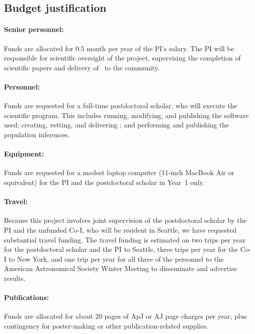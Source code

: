 \documentclass[12pt]{article}
\begin{document}
\subsection*{Budget justification}

\paragraph{Senior personnel:}
Funds are allocated for 0.5 month per year of the PI's salary.
The PI will be responsible for scientific oversight of the project,
supervising the completion of scientific papers and delivery of
\catalogname\ to the community.

\paragraph{Personnel:}
Funds are requested for a full-time postdoctoral scholar, who will
execute the scientific program.
This includes running, modifying, and publishing the software used;
creating, vetting, and delivering \catalogname;
and performing and publishing the population inferences.

\paragraph{Equipment:}
Funds are requested for a modest laptop computer (11-inch MacBook Air
or equivalent) for the PI and the postdoctoral scholar in Year~1 only.

\paragraph{Travel:}
Because this project involves joint supervision of the postdoctoral
scholar by the PI and the unfunded Co-I, who will be resident in
Seattle, we have requested substantial travel funding.
The travel funding is estimated on two trips per year for the
postdoctoral scholar and the PI to Seattle, three trips per year
for the Co-I to New York, and one trip per year for all three of
the personnel to the American Astronomical
Society Winter Meeting to disseminate and advertise results.

\paragraph{Publications:}
Funds are allocated for about 20 pages of ApJ or AJ page charges per
year, plus contingency for poster-making or other publication-related
supplies.
\end{document}
